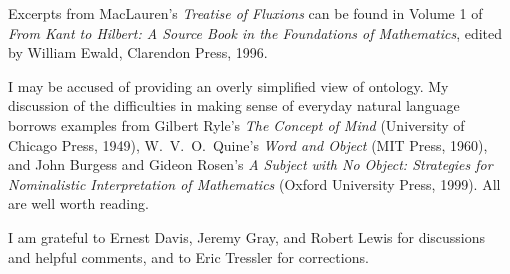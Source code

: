 \documentclass[11pt]{article}
\begin{document}
Excerpts from MacLauren's \emph{Treatise of Fluxions} can be found in Volume 1 of  \emph{From Kant to Hilbert: A Source Book in the Foundations of Mathematics}, edited by William Ewald, Clarendon Press, 1996.

I may be accused of providing an overly simplified view of ontology. My discussion of the difficulties in making sense of everyday natural language borrows examples from Gilbert Ryle's \emph{The Concept of Mind} (University of Chicago Press, 1949), W.~V.~O.~Quine's \emph{Word and Object} (MIT Press, 1960), and John Burgess and Gideon Rosen's \emph{A Subject with No Object: Strategies for Nominalistic Interpretation of Mathematics} (Oxford University Press, 1999). All are well worth reading.

I am grateful to Ernest Davis, Jeremy Gray, and Robert Lewis for discussions and helpful comments, and to Eric Tressler for corrections.
\end{document}
